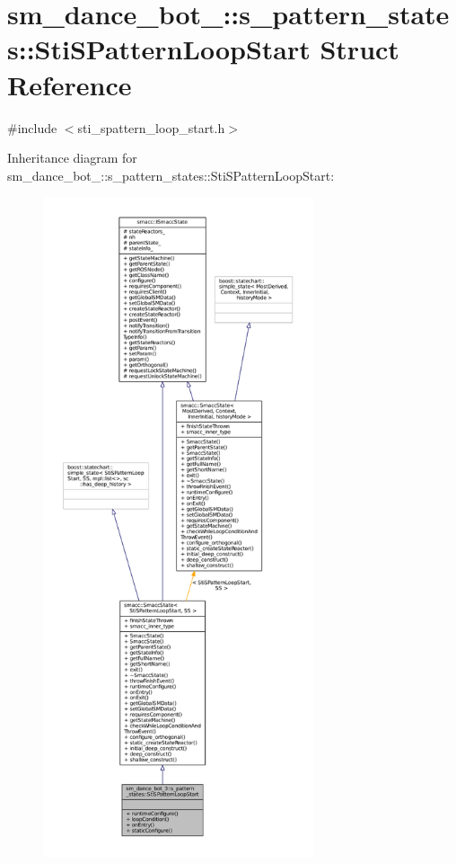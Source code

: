 \hypertarget{structsm__dance__bot__3_1_1s__pattern__states_1_1StiSPatternLoopStart}{}\section{sm\+\_\+dance\+\_\+bot\+\_\+:\+:s\+\_\+pattern\+\_\+states\+:\+:Sti\+S\+Pattern\+Loop\+Start Struct Reference}
\label{structsm__dance__bot__3_1_1s__pattern__states_1_1StiSPatternLoopStart}


{\ttfamily \#include $<$sti\+\_\+spattern\+\_\+loop\+\_\+start.\+h$>$}



Inheritance diagram for sm\+\_\+dance\+\_\+bot\+\_\+:\+:s\+\_\+pattern\+\_\+states\+:\+:Sti\+S\+Pattern\+Loop\+Start\+:
\nopagebreak
\begin{figure}[H]
\begin{center}
\leavevmode
\includegraphics[height=550pt]{structsm__dance__bot__3_1_1s__pattern__states_1_1StiSPatternLoopStart__inherit__graph}
\end{center}
\end{figure}


